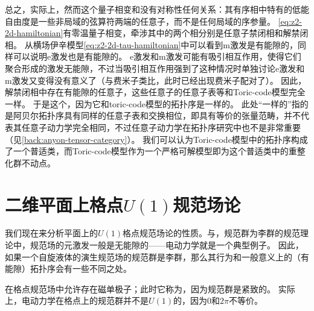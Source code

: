 总之，实际上，然而这个量子相变和没有对称性任何关系：其有序相中特有的低能自由度是一些非局域的弦算符两端的任意子，而不是任何局域的序参量。
\eqref{eq:z2-2d-hamiltonian}有零温量子相变，牵涉其中的两个相分别是任意子禁闭相和解禁闭相。
从横场伊辛模型\eqref{eq:z2-2d-tau-hamiltonian}中可以看到m激发是有能隙的，同样可以说明e激发也是有能隙的。
e激发和m激发可能有吸引相互作用，使得它们聚合形成的激发无能隙，不过当吸引相互作用强到了这种情况时单独讨论e激发和m激发又变得没有意义了（与费米子类比，此时已经出现费米子配对了）。
因此，解禁闭相中存在有能隙的任意子，这些任意子的任意子表等和Toric-code模型完全一样。
于是这个，因为它和toric-code模型的拓扑序是一样的。
此处“一样的”指的是阿贝尔拓扑序具有同样的任意子表和交换相位，即具有等价的张量范畴，并不代表其任意子动力学完全相同，不过任意子动力学在拓扑序研究中也不是非常重要（见\autoref{back:anyon-tensor-category}）。
我们可以认为Toric-code模型中的拓扑序构成了一个普适类，而Toric-code模型作为一个严格可解模型即为这个普适类中的重整化群不动点。




\section{二维平面上格点$U(1)$规范场论}

我们现在来分析平面上的$U(1)$格点规范场论的性质。与，规范群为李群的规范理论中，规范场的元激发一般是无能隙的——电动力学就是一个典型例子。
因此，如果一个自旋液体的演生规范场的规范群是李群，那么其行为和一般意义上的（有能隙）拓扑序会有一些不同之处。

在格点规范场中允许存在磁单极子；此时它称为，因为规范群是紧致的。
实际上，电动力学在格点上的规范群并不是$U(1)$的，因为$0$和$2\pi$不等价。
